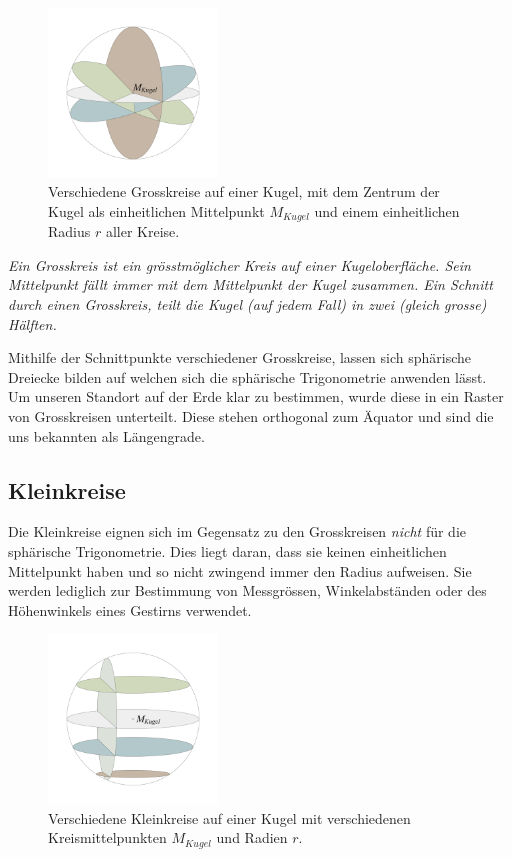 \begin{refsection}
\begin{figure}[htbp]
\centering
\includegraphics[width=0.4\textwidth]{kugel/Grosskreise.jpg}
\caption{Verschiedene Grosskreise auf einer Kugel, mit dem Zentrum der Kugel als einheitlichen Mittelpunkt $M_{Kugel}$ und einem einheitlichen Radius $r$ aller Kreise.}
\end{figure}

\begin{definition}
\textit{Ein Grosskreis ist ein grösstmöglicher Kreis auf einer Kugeloberfläche. Sein Mittelpunkt fällt immer mit dem Mittelpunkt der Kugel zusammen. Ein Schnitt durch einen Grosskreis, teilt die Kugel (auf jedem Fall) in zwei (gleich grosse) Hälften.}
\label{skript:kugel:satz:Grosskreis}
\end{definition}

Mithilfe der Schnittpunkte verschiedener Grosskreise, lassen sich sphärische Dreiecke bilden auf welchen sich die sphärische Trigonometrie anwenden lässt.
Um unseren Standort auf der Erde klar zu bestimmen, wurde diese in ein Raster von Grosskreisen unterteilt. Diese stehen orthogonal zum Äquator und sind die uns bekannten als Längengrade.

\subsection{Kleinkreise}
Die Kleinkreise eignen sich im Gegensatz zu den Grosskreisen \textit{nicht} für die sphärische Trigonometrie.  Dies liegt daran, dass sie keinen einheitlichen Mittelpunkt haben und so nicht zwingend immer den Radius aufweisen.
Sie werden lediglich zur Bestimmung von Messgrössen, Winkelabständen oder des Höhenwinkels eines Gestirns verwendet. 

\begin{figure}[htbp]
\centering
\includegraphics[width=0.4\textwidth]{kugel/Kleinkreise.jpg}
\caption{Verschiedene Kleinkreise auf einer Kugel mit verschiedenen Kreismittelpunkten $M_{Kugel}$ und Radien $r$.}
\end{figure}


\end{refsection}
